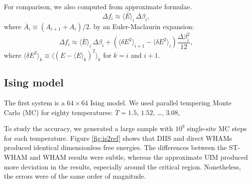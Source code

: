 \documentclass[reprint,aip,jcp,superscriptaddress]{revtex4-1}
\begin{document}
For comparison,
we also computed 
from  approximate formulae.
%
\cite{park2007}
%
\begin{equation}
\Delta f_i
\approx
\overline{ \langle E \rangle }_i \, \Delta \beta_i,
\label{eq:df_eav}
\end{equation}
where
$\overline{ A }_i \equiv (A_{i+1} + A_i)/2$.
%
by an Euler-Maclaurin expansion\cite{
arfken, *abramowitz, *wang_specfunc, whittaker}:
%
\begin{equation}
\Delta f_i
\approx
\overline{ \langle E \rangle }_i \, \Delta \beta_i
+
\left(
  \langle \delta E^2 \rangle_{i+1}
-
  \langle \delta E^2 \rangle_i
\right)
\frac{ \Delta \beta_i^2 }{ 12 },
\label{eq:df_eavb}
\end{equation}
%
where
$\langle \delta E^2 \rangle_k
\equiv \langle (E - \langle E \rangle_k)^2 \rangle_k$
for $k = i$ and $i + 1$.
%





\subsection{\label{sec:results_Ising}
Ising model}





The first system is
a $64\times64$ Ising model.
%
We used parallel tempering\cite{
swendsen1986, *geyer1991, *hukushima1996, *hansmann1997, *earl2005}
Monte Carlo (MC)
for
eighty temperatures: $T = 1.5$, $1.52$, \dots, $3.08$,



To study the accuracy,
we generated a large sample with
$10^9$ single-site MC steps for each temperature.
%
Figure \ref{fig:is2ref} shows that
DIIS and direct WHAMs produced identical
dimensionless free energies.
%
The differences between the ST-WHAM and WHAM results
were subtle,
whereas the approximate UIM
produced more deviation in the results,
especially around the critical region.
%
Nonetheless,
the errors were of the same order of magnitude.
\end{document}
